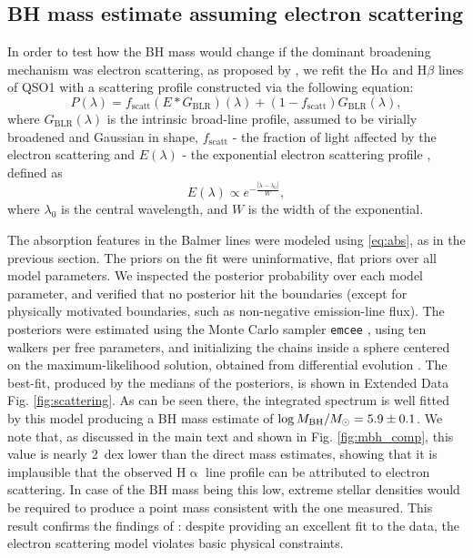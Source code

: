 \documentclass[twocolumn, fleqn]{doc_class}
\newcommand{\Halpha}{\ensuremath{\mathrm{H}\upalpha}\xspace}
\begin{document}
\subsection*{BH mass estimate assuming electron scattering}
In order to test how the BH mass would change if the dominant broadening mechanism was electron scattering, as proposed by , we refit the H$\alpha$ and H$\beta$ lines of QSO1 with a scattering profile constructed via the following equation:
\begin{equation}
    P(\lambda) = f_\text{scatt} (E*G_\text{BLR})(\lambda) + (1 - f_\text{scatt}) G_\text{BLR}(\lambda),
\end{equation}
where $G_\text{BLR}(\lambda)$ is the intrinsic broad-line profile, assumed to be virially broadened and Gaussian in shape, $f_\text{scatt}$ - the fraction of light affected by the electron scattering and $E(\lambda)$ - the exponential electron scattering profile , defined as
\begin{equation}
    E(\lambda) \propto e^{- \frac{|\lambda - \lambda_0 |}{W}},
\end{equation}
where $\lambda_0$ is the central wavelength, and $W$ is the width of the exponential.

The absorption features in the Balmer lines were modeled using \autoref{eq:abs}, as in the previous section. The priors on the fit were uninformative, flat priors over all model parameters. We inspected the posterior probability over each model parameter, and verified that no posterior hit the boundaries (except for physically motivated boundaries, such as non-negative emission-line flux). The posteriors were estimated using the Monte Carlo sampler \texttt{emcee} , using ten walkers per free parameters, and initializing
the chains inside a sphere centered on the maximum-likelihood solution, obtained from
differential evolution . The best-fit, produced by the medians of the posteriors, is shown in Extended Data Fig. \ref{fig:scattering}. As can be seen there, the integrated spectrum is well fitted by this model producing a BH mass estimate of $\log{M_{\rm BH}/M_\odot} = 5.9 \pm 0.1$. We note that, as discussed in the main text and shown in Fig. \ref{fig:mbh_comp}, this value is nearly 2~dex lower than the direct mass estimates, showing that it is implausible that the observed \Halpha line profile can be attributed to electron scattering. In case of the BH mass being this low, extreme stellar densities would be required to produce a point mass consistent with the one measured. This result confirms the findings of : despite providing
an excellent fit to the data, the electron scattering model violates basic physical constraints.
\end{document}
